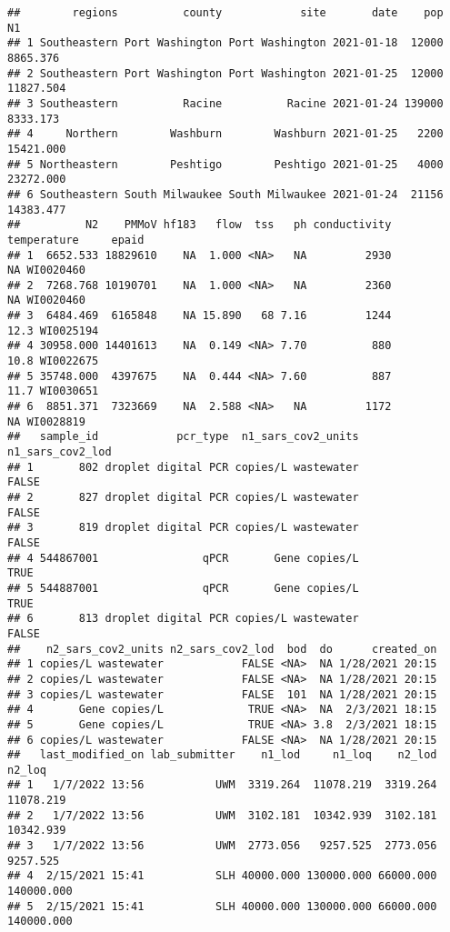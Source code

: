 \documentclass[
]{article}
\begin{document}
\begin{verbatim}
##        regions          county            site       date    pop        N1
## 1 Southeastern Port Washington Port Washington 2021-01-18  12000  8865.376
## 2 Southeastern Port Washington Port Washington 2021-01-25  12000 11827.504
## 3 Southeastern          Racine          Racine 2021-01-24 139000  8333.173
## 4     Northern        Washburn        Washburn 2021-01-25   2200 15421.000
## 5 Northeastern        Peshtigo        Peshtigo 2021-01-25   4000 23272.000
## 6 Southeastern South Milwaukee South Milwaukee 2021-01-24  21156 14383.477
##          N2    PMMoV hf183   flow  tss   ph conductivity temperature     epaid
## 1  6652.533 18829610    NA  1.000 <NA>   NA         2930          NA WI0020460
## 2  7268.768 10190701    NA  1.000 <NA>   NA         2360          NA WI0020460
## 3  6484.469  6165848    NA 15.890   68 7.16         1244        12.3 WI0025194
## 4 30958.000 14401613    NA  0.149 <NA> 7.70          880        10.8 WI0022675
## 5 35748.000  4397675    NA  0.444 <NA> 7.60          887        11.7 WI0030651
## 6  8851.371  7323669    NA  2.588 <NA>   NA         1172          NA WI0028819
##   sample_id            pcr_type  n1_sars_cov2_units n1_sars_cov2_lod
## 1       802 droplet digital PCR copies/L wastewater            FALSE
## 2       827 droplet digital PCR copies/L wastewater            FALSE
## 3       819 droplet digital PCR copies/L wastewater            FALSE
## 4 544867001                qPCR       Gene copies/L             TRUE
## 5 544887001                qPCR       Gene copies/L             TRUE
## 6       813 droplet digital PCR copies/L wastewater            FALSE
##    n2_sars_cov2_units n2_sars_cov2_lod  bod  do      created_on
## 1 copies/L wastewater            FALSE <NA>  NA 1/28/2021 20:15
## 2 copies/L wastewater            FALSE <NA>  NA 1/28/2021 20:15
## 3 copies/L wastewater            FALSE  101  NA 1/28/2021 20:15
## 4       Gene copies/L             TRUE <NA>  NA  2/3/2021 18:15
## 5       Gene copies/L             TRUE <NA> 3.8  2/3/2021 18:15
## 6 copies/L wastewater            FALSE <NA>  NA 1/28/2021 20:15
##   last_modified_on lab_submitter    n1_lod     n1_loq    n2_lod     n2_loq
## 1   1/7/2022 13:56           UWM  3319.264  11078.219  3319.264  11078.219
## 2   1/7/2022 13:56           UWM  3102.181  10342.939  3102.181  10342.939
## 3   1/7/2022 13:56           UWM  2773.056   9257.525  2773.056   9257.525
## 4  2/15/2021 15:41           SLH 40000.000 130000.000 66000.000 140000.000
## 5  2/15/2021 15:41           SLH 40000.000 130000.000 66000.000 140000.000

\end{verbatim}
\end{document}
